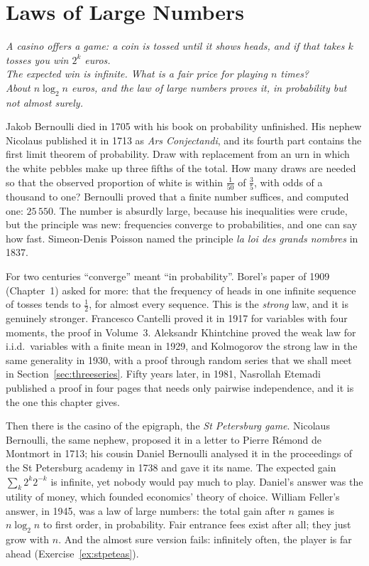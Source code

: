 \chapter{Laws of Large Numbers}
\begin{center}\itshape
A casino offers a game: a coin is tossed until it shows heads, and if that takes $k$ tosses you win $2^k$ euros.\\
The expected win is infinite. What is a fair price for playing $n$ times?\\
About $n\log_2n$ euros, and the law of large numbers proves it, in probability but not almost surely.
\end{center}

Jakob Bernoulli died in 1705 with his book on probability unfinished. His nephew Nicolaus published it in 1713 as \emph{Ars
Conjectandi}, and its fourth part contains the first limit theorem of probability. Draw with replacement from an urn in which
the white pebbles make up three fifths of the total. How many draws are needed so that the observed proportion of white is
within $\frac1{50}$ of $\frac35$, with odds of a thousand to one? Bernoulli proved that a finite number suffices, and computed
one: $25\,550$. The number is absurdly large, because his inequalities were crude, but the principle was new: frequencies converge
to probabilities, and one can say how fast. Simeon-Denis Poisson named the principle \emph{la loi des grands nombres} in 1837.

For two centuries ``converge'' meant ``in probability''. Borel's paper of 1909 (Chapter~1) asked for more: that the
frequency of heads in one infinite sequence of tosses tends to $\frac12$, for almost every sequence. This is the \emph{strong}
law, and it is genuinely stronger. Francesco Cantelli proved it in 1917 for variables with four moments, the proof in Volume~3.
Aleksandr Khintchine proved the weak law for i.i.d.\ variables with a finite mean in 1929, and Kolmogorov the strong law in the same
generality in 1930, with a proof through random series that we shall meet in Section~\ref{sec:threeseries}. Fifty years later, in 1981,
Nasrollah Etemadi published a proof in four pages that needs only pairwise independence, and it is the one this chapter gives.

Then there is the casino of the epigraph, the \emph{St Petersburg game}. Nicolaus Bernoulli, the same nephew, proposed it in a letter
to Pierre R\'emond de Montmort in 1713; his cousin Daniel Bernoulli analysed it in the proceedings of the St Petersburg academy in 1738
and gave it its name. The expected gain $\sum_k2^k2^{-k}$ is infinite, yet nobody would pay much to play. Daniel's answer was the
utility of money, which founded economics' theory of choice. William Feller's answer, in 1945, was a law of large numbers: the
total gain after $n$ games is $n\log_2n$ to first order, in probability. Fair entrance fees exist after all; they just grow with $n$.
And the almost sure version fails: infinitely often, the player is far ahead (Exercise~\ref{ex:stpeteas}).

